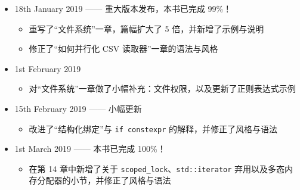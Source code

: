 \begin{itemize}
\begin{itemize}
  \item 重写了“文件系统”一章，篇幅扩大了 5 倍，并新增了示例与说明
  \item 修正了“如何并行化 CSV 读取器”一章的语法与风格
  \end{itemize}
\item 18th January 2019 —— 重大版本发布，本书已完成 99\%！
  \begin{itemize}
  \item 重写了“文件系统”一章，篇幅扩大了 5 倍，并新增了示例与说明
  \item 修正了“如何并行化 CSV 读取器”一章的语法与风格
  \end{itemize}
\item 1st February 2019
  \begin{itemize}
  \item 对“文件系统”一章做了小幅补充：文件权限，以及更新了正则表达式示例
  \end{itemize}
\item 15th February 2019 —— 小幅更新
  \begin{itemize}
  \item 改进了“结构化绑定”与 \texttt{if constexpr} 的解释，并修正了风格与语法
  \end{itemize}
\item 1st March 2019 —— 本书已完成 100\%！
  \begin{itemize}
  \item 在第 14 章中新增了关于 \texttt{scoped\_lock}、\texttt{std::iterator} 弃用以及多态内存分配器的小节，并修正了风格与语法
  \end{itemize}
\end{itemize}
